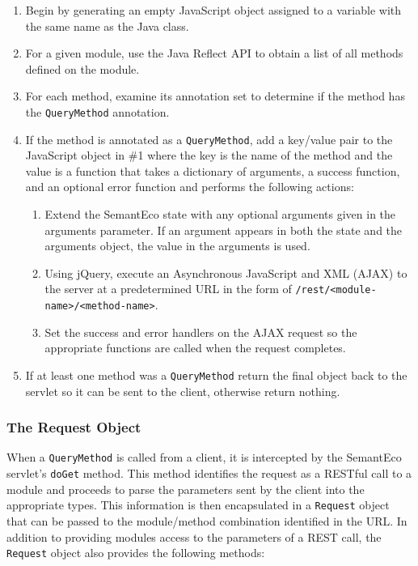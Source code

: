 \documentclass[letterpaper]{report}
\begin{document}
\begin{enumerate}
\item Begin by generating an empty JavaScript object assigned to a variable with the same name as the Java class.
\item For a given module, use the Java Reflect API to obtain a list of all methods defined on the module.
\item For each method, examine its annotation set to determine if the method has the \texttt{QueryMethod} annotation.
\item If the method is annotated as a \texttt{QueryMethod}, add a key/value pair to the JavaScript object in \#1 where the key is the name of the method and the value is a function that takes a dictionary of arguments, a success function, and an optional error function and performs the following actions:
\begin{enumerate}
\item Extend the SemantEco state with any optional arguments given in the arguments parameter. If an argument appears in both the state and the arguments object, the value in the arguments is used.
\item Using jQuery, execute an Asynchronous JavaScript and XML (AJAX) to the server at a predetermined URL in the form of \texttt{/rest/<module-name>/<method-name>}.
\item Set the success and error handlers on the AJAX request so the appropriate functions are called when the request completes.
\end{enumerate}
\item If at least one method was a \texttt{QueryMethod} return the final object back to the servlet so it can be sent to the client, otherwise return nothing.
\end{enumerate}

\subsubsection{The Request Object}
When a \texttt{QueryMethod} is called from a client, it is intercepted by the SemantEco servlet's \texttt{doGet} method. This method identifies the request as a RESTful call to a module and proceeds to parse the parameters sent by the client into the appropriate types. This information is then encapsulated in a \texttt{Request} object that can be passed to the module/method combination identified in the URL. In addition to providing modules access to the parameters of a REST call, the \texttt{Request} object also provides the following methods:
\end{document}
